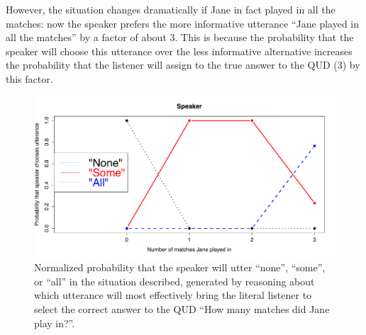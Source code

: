 \documentclass[pdfextras]{handbook}
\begin{document}
However, the situation changes dramatically if Jane in fact played in all the matches: now the speaker prefers the more informative utterance ``Jane played in all the matches'' by a factor of about 3. This is because the probability that the speaker will choose this utterance over the less informative alternative increases the probability that the listener will assign to the true answer to the QUD (3) by this factor. 
\begin{figure}[tbh]
\begin{center}
\includegraphics[scale=.3]{S1.pdf}
\end{center}
\label{sprk-SI}
\caption{Normalized probability that the speaker will utter ``none'', ``some'', or ``all'' in the situation described, generated by reasoning about which utterance will most effectively bring the literal listener to select the correct answer to the QUD ``How many matches did Jane play in?''.}
\end{figure}
\end{document}
